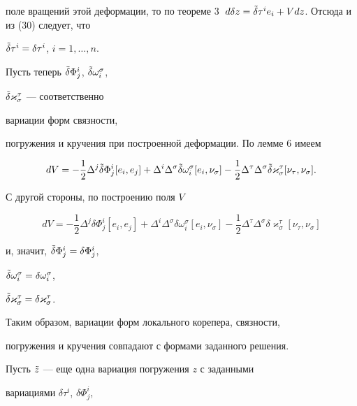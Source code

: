 \begin{pf}
поле вращений этой деформации, то по теореме 3 $\;d\delta


z=\Tilde\delta\tau^ie_i+Vdz$. Отсюда и из (30) следует, что


$\Tilde\delta\tau^i=\delta\tau^i$, $i=1,\dotsc,n$.





Пусть теперь $\Tilde\delta\Phi^i_j$, $\Tilde\delta\omega^{\sigma}_i$,


$\Tilde\delta\varkappa^{\tau}_{\sigma}$ --- соответственно


вариации форм связности,


погружения и кручения при построенной деформации. По лемме 6 имеем


$$


dV=-\frac{1}{2}\Delta^j\Tilde\delta\Phi^i_j[e_i,e_j]+


\Delta^i\Delta^{\sigma}\Tilde\delta\omega^{\sigma}_i[e_i,\nu_{\sigma}]-


\frac{1}{2}\Delta^{\tau}\Delta^{\sigma}\Tilde\delta


\varkappa^{\tau}_{\sigma}[\nu_{\tau},\nu_{\sigma}].


$$


С другой стороны, по построению поля $V$


$$


dV=-\frac{1}{2}\Delta^j\delta\Phi^i_j[e_i,e_j]+


\Delta^i\Delta^{\sigma}\delta\omega^{\sigma}_i[e_i,\nu_{\sigma}]-


\frac{1}{2}\Delta^{\tau}\Delta^{\sigma}\delta


\varkappa^{\tau}_{\sigma}[\nu_{\tau},\nu_{\sigma}]


$$


и, значит, $\Tilde\delta\Phi^i_j=\delta\Phi^i_j$,


$\Tilde\delta\omega^{\sigma}_i=\delta\omega^{\sigma}_i$,


$\Tilde\delta\varkappa^{\tau}_{\sigma}=


\delta\varkappa^{\tau}_{\sigma}$.


Таким образом, вариации форм локального корепера, связности,


погружения и кручения совпадают с формами заданного решения.





Пусть $\Tilde z$ --- еще одна вариация погружения $z$ с заданными


вариациями $\delta\tau^i$, $\delta\Phi^i_j$,



\end{pf}
